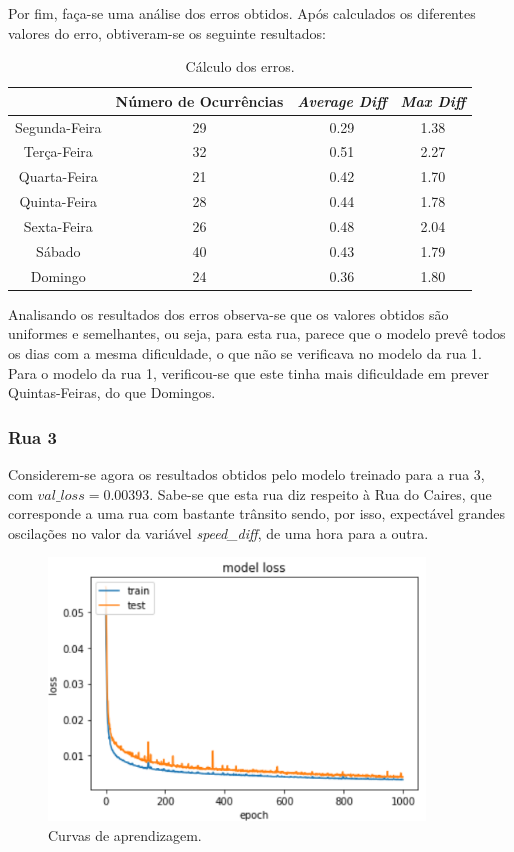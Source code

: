 \documentclass[a4paper, 12pt]{article}
\begin{document}
Por fim, faça-se uma análise dos erros obtidos. Após calculados os diferentes valores do erro, obtiveram-se os seguinte resultados:

\begin{table}[H]
	\centering
	\begin{tabular}{||c||c|c|c||}
		\hline\hline
		& Número de Ocurrências & \textit{Average Diff} & \textit{Max Diff} \\
		\hline\hline
		 Segunda-Feira &29& 0.29& 1.38 \\
		\hline
		 Terça-Feira  &32&0.51 & 2.27\\
		\hline
		 Quarta-Feira&21 & 0.42& 1.70	\\
		\hline
		 Quinta-Feira&28  & 0.44& 1.78	\\
		\hline
		 Sexta-Feira &26& 0.48& 2.04  \\
		\hline
		 Sábado &40 & 0.43
 & 1.79\\
		\hline
		 Domingo & 24&
0.36 & 
1.80
\\
		\hline\hline
	\end{tabular}
	\label{table:rua2}
	\caption{Cálculo dos erros.}
\end{table}

Analisando os resultados dos erros observa-se que os valores obtidos são uniformes e semelhantes, ou seja, para esta rua, parece que o modelo prevê todos os dias com a mesma dificuldade, o que não se verificava no modelo da rua 1. Para o modelo da rua 1, verificou-se que este tinha mais dificuldade em prever Quintas-Feiras, do que Domingos.

\subsubsection{Rua 3}

Considerem-se agora os resultados obtidos pelo modelo treinado para a rua 3, com $val\_loss=0.00393$. Sabe-se que esta rua diz respeito à Rua do Caires, que corresponde a uma rua com bastante trânsito sendo, por isso, expectável grandes oscilações no valor da variável \textit{speed\_diff}, de uma hora para a outra.

\begin{figure}[H]
	\centering
	\includegraphics[width=10cm]{resultados/curvas_aprend_3.png}
	\caption{Curvas de aprendizagem.}
\end{figure}
\end{document}
